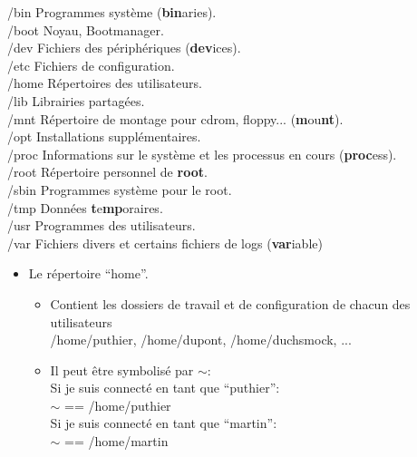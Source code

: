 \documentclass[10pt, xcolor=dvipsnames]{beamer}
\begin{document}
\begin{frame}[fragile]
	/bin Programmes système (\textbf{bin}aries).\\
    /boot Noyau, Bootmanager.\\
    /dev Fichiers des périphériques (\textbf{dev}ices).\\
    /etc Fichiers de configuration.\\
    /home Répertoires des utilisateurs.\\
    /lib Librairies partagées.\\
    /mnt Répertoire de montage pour cdrom, floppy... (\textbf{m}ou\textbf{nt}).\\
    /opt Installations supplémentaires.\\
    /proc Informations sur le système et les processus en cours (\textbf{proc}ess).\\
    /root Répertoire personnel de \textbf{root}.\\
    /sbin Programmes système pour le root.\\
    /tmp Données \textbf{t}e\textbf{mp}oraires.\\
    /usr Programmes des utilisateurs.\\
    /var Fichiers divers et certains fichiers de logs (\textbf{var}iable)\\

\end{frame}


\begin{frame}[fragile]

    \begin{itemize}
    \item Le répertoire ``home''.
        \begin{itemize}
        \item Contient les dossiers de travail et de configuration de chacun des utilisateurs \\
        /home/puthier, /home/dupont, /home/duchsmock, ...
        \item Il peut être symbolisé par $\sim$:\\
        Si je suis connecté en tant que ``puthier'':\\
         $\sim$ == /home/puthier\\
        Si je suis connecté en tant que ``martin'':\\
         $\sim$ == /home/martin
        \end{itemize}
    \end{itemize}

\end{frame}
\end{document}

